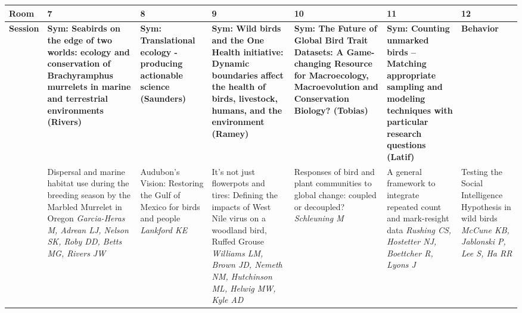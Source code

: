 \begin{tabular}{|x{0.75cm}|a{2.25cm}|a{2.25cm}|a{2.25cm}|a{2.25cm}|a{2.25cm}|x{2.25cm}|}\hline
Room & 7 & 8 & 9 & 10 & 11 & 12\\
\hline
\rule{0pt}{1em} \textbf{Session} &\footnotesize \textbf{Sym: Seabirds on the edge of two worlds: ecology and conservation of Brachyramphus murrelets in marine and terrestrial environments (Rivers)} & \footnotesize \textbf{Sym: Translational ecology - producing actionable science (Saunders)} & \footnotesize \textbf{Sym: Wild birds and the One Health initiative: Dynamic boundaries affect the health of birds, livestock, humans, and the environment (Ramey)} & \footnotesize \textbf{Sym: The Future of Global Bird Trait Datasets: A Game-changing Resource for Macroecology, Macroevolution and Conservation Biology? (Tobias)} & \footnotesize \textbf{Sym: Counting unmarked birds – Matching appropriate sampling and modeling techniques with particular research questions (Latif)} & \footnotesize \textbf{Behavior}\\
\hline
{}&Dispersal and marine habitat use during the breeding season by the Marbled Murrelet in Oregon \newline \newline \textit{Garcia-Heras M, Adrean LJ, Nelson SK, Roby DD, Betts MG, Rivers JW} & Audubon's Vision: Restoring the Gulf of Mexico for birds and people \newline \newline \textit{Lankford KE} & It’s not just flowerpots and tires: Defining the impacts of West Nile virus on a woodland bird, Ruffed Grouse \newline \newline \textit{Williams LM, Brown JD, Nemeth NM, Hutchinson ML, Helwig MW, Kyle AD} & Responses of bird and plant communities to global change: coupled or decoupled? \newline \newline \textit{Schleuning M} & A general framework to integrate repeated count and mark-resight data \newline \newline \textit{Rushing CS, Hostetter NJ, Boettcher R, Lyons J} & Testing the Social Intelligence Hypothesis in wild birds \newline \newline \textit{McCune KB, Jablonski P, Lee S, Ha RR}\\
\hline

\end{tabular}
